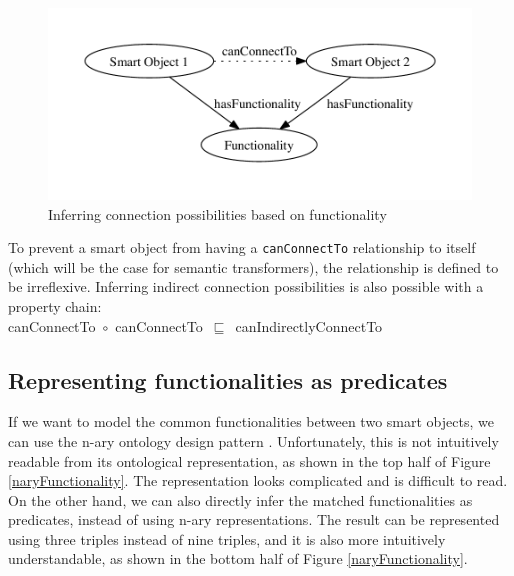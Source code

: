 \begin{figure}[bth]
        \includegraphics[width=\linewidth]{canConnectTo}
        \caption{Inferring connection possibilities based on functionality}
        \label{canConnectTo}
\end{figure}

To prevent a smart object from having a \texttt{canConnectTo} relationship to itself (which will be the case for semantic transformers), the relationship is defined to be irreflexive. Inferring indirect connection possibilities is also possible with a property chain:\\

\noindent
canConnectTo~\ensuremath{\circ}~canConnectTo~\ensuremath{\sqsubseteq}~canIndirectlyConnectTo



\subsection{Representing functionalities as predicates}
\label{predicateFunctionality}
If we want to model the common functionalities between two smart objects, we can use the n-ary ontology design pattern \cite{Noy2006}. Unfortunately, this is not intuitively readable from its ontological representation, as shown in the top half of Figure \ref{naryFunctionality}. The representation looks complicated and is difficult to read. On the other hand, we can also directly infer the matched functionalities as predicates, instead of using n-ary representations. The result can be represented using three triples instead of nine triples, and it is also more intuitively understandable, as shown in the bottom half of Figure \ref{naryFunctionality}.

